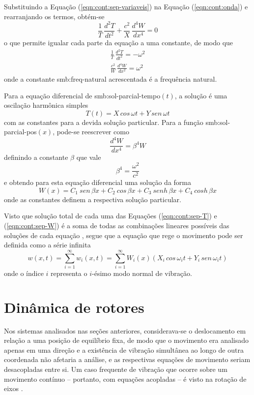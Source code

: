 \documentclass[12pt,openright,oneside,a4paper,
	chapter=TITLE,section=TITLE,
	english,brazil]{abntex2}
\begin{document}
	Substituindo a Equação (\ref{eqn:cont:sep-variaveis}) na Equação (\ref{eqn:cont:onda}) e rearranjando os termos, obtém-se 
	\begin{equation} \label{eqn:cont:geral-vigas}
		\frac{1}{T}\,\frac{d^2T}{dt^2} + \frac{c^2}{X}\,\frac{d^4W}{dx^4} = 0
	\end{equation}
	o que permite \cite{clark:1972} igualar cada parte da equação a uma constante, de modo que
	\begin{align*}
		\frac{1}{T}\,\frac{d^2T}{dt^2} = -\omega^2 \\
		\frac{c^2}{W}\,\frac{d^4W}{dx^2} = \omega^2
	\end{align*}
	onde a constante \gls{smb:freq-natural} acrescentada é a frequência natural. 
	
	Para a equação diferencial de \gls{smb:sol-parcial-tempo}$(t)$, a solução é uma oscilação harmônica simples 
	\begin{equation} \label{eqn:cont:sep-T}
		T(t) = X\,cos\,\omega t + Y\,sen\,\omega t
	\end{equation}
	com as constantes  para a devida solução particular. Para a função \gls{smb:sol-parcial-pos}$(x)$, pode-se reescrever como \[\frac{d^4W}{dx^4} = \beta^4W \] definindo a constante $\beta$ que vale \[\beta^4 = \frac{\omega^2}{c^2} \] e obtendo para esta equação diferencial uma solução da forma
	\begin{equation} \label{eqn:cont:sep-W}
		W(x) = C_1\:sen\,\beta x + C_2\:cos\,\beta x + C_3\:senh\,\beta x + C_4\:cosh\,\beta x
	\end{equation}
	onde as constantes  definem a respectiva solução particular.
	
	Visto que solução total de cada uma das Equações (\ref{eqn:cont:sep-T}) e (\ref{eqn:cont:sep-W}) é a soma de todas as combinações lineares possíveis das soluções de cada equação \cite{boyce:2017}, segue que a equação que rege o movimento pode ser definida como a série infinita \cite{clark:1972}
	\begin{equation}
		w(x,t) = \sum_{i=1}^{\infty}w_i(x,t) = \sum_{i=1}^{\infty}W_i(x)(X_i\,cos\,\omega_i t + Y_i\,sen\,\omega_i t)
	\end{equation}
	onde o índice $i$ representa o $i$-ésimo modo normal de vibração.
	
	\section{Dinâmica de rotores}
	Nos sistemas analisados nas seções anteriores, considerava-se o deslocamento em relação a uma posição de equilíbrio fixa, de modo que o movimento era analisado apenas em uma direção e a existência de vibração simultânea ao longo de outra coordenada não afetaria a análise, e as respectivas equações de movimento seriam desacopladas entre si. Um caso frequente de vibração que ocorre sobre um movimento contínuo -- portanto, com equações acopladas -- é visto na rotação de eixos \cite{dimarogonas:1995}.

	\postextual
	
	
		
\end{document}

